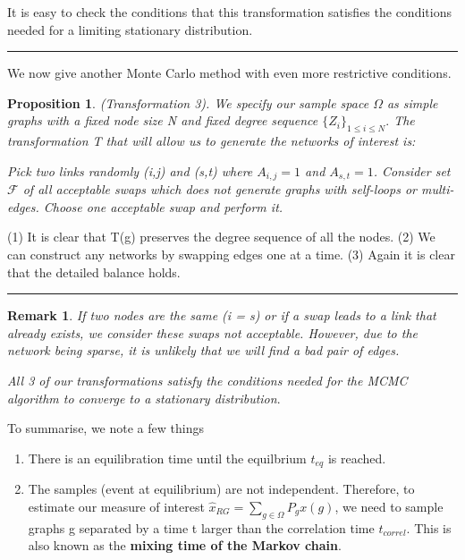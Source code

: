 \documentclass[twoside]{article}
\newtheorem{proposition}[theorem]{Proposition}
\newtheorem{remark}[theorem]{Remark}
\newenvironment{proof}{{\bf Proof:}}{\hfill\rule{2mm}{2mm}}
\begin{document}
\begin{proof} It is easy to check the conditions that this transformation satisfies the conditions needed for a limiting stationary distribution.
\end{proof}

 We now give another Monte Carlo method with even more restrictive conditions.


\begin{proposition}(Transformation 3). We specify our sample space $\Omega$ as simple graphs with a fixed node size N and fixed degree sequence $\{Z_i\}_{1 \leq i \leq N}.$ The transformation T that will allow us to generate the networks of interest is:
\begin{algorithm}
\DontPrintSemicolon
Pick two links randomly (i,j) and (s,t) where $A_{i,j} = 1$ and $A_{s,t} = 1$.\;
Consider set $\mathcal{F}$ of all acceptable swaps which does not generate graphs with self-loops or multi-edges.\;
Choose one acceptable swap and perform it.\;
\caption{{\sc Transformation 3}}
\end{algorithm}
\end{proposition}

\begin{proof} (1) It is clear that T(g) preserves the degree sequence of all the nodes. (2) We can construct any networks by swapping edges one at a time. (3) Again it is clear that the detailed balance holds.
\end{proof}

\begin{remark}If two nodes are the same (i = s) or if a swap leads to a link that already exists, we consider these swaps not acceptable. However, due to the network being sparse, it is unlikely that we will find a bad pair of edges.
\end{remark}

\textit{All 3 of our transformations satisfy the conditions needed for the MCMC algorithm to converge to a stationary distribution}.

To summarise, we note a few things 
\begin{enumerate}
\item There is an equilibration time until the equilbrium $t_{eq}$ is reached.
\item The samples (event at equilibrium) are not independent. Therefore, to estimate our measure of interest $\hat{x}_{RG} = \sum_{g \in \Omega}P_gx(g)$, we need to sample graphs g separated by a time t larger than the correlation time $t_{correl}.$ This is also known as the \textbf{mixing time of the Markov chain}.
\end{enumerate}
\end{document}
